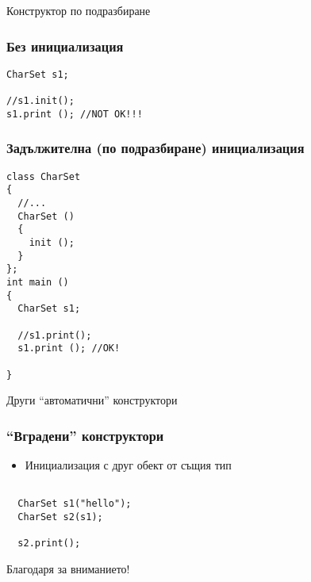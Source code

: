 \documentclass{beamer}
\begin{document}
\begin{frame}
\centerline{Конструктор по подразбиране}
\end{frame}


\begin{frame}[fragile]
\frametitle{Без инициализация}


\begin{flushleft}
\begin{lstlisting}
CharSet s1;

//s1.init();
s1.print (); //NOT OK!!!

\end{lstlisting}  
\end{flushleft}
\end{frame}

\begin{frame}[fragile]
\frametitle{Задължителна (по подразбиране) инициализация}


\begin{flushleft}
\begin{lstlisting}
class CharSet
{
  //...
  CharSet ()
  {
    init ();
  }
};
int main ()
{
  CharSet s1;

  //s1.print();
  s1.print (); //OK!

}
\end{lstlisting}  
\end{flushleft}
\end{frame}


\begin{frame}
\centerline{Други ``автоматични'' конструктори}
\end{frame}


\begin{frame}[fragile]
\frametitle{``Вградени'' конструктори}

\begin{itemize}
  \item Инициализация с друг обект от същия тип 
\end{itemize}

\begin{flushleft}
\begin{lstlisting}

  CharSet s1("hello");
  CharSet s2(s1); 

  s2.print();

\end{lstlisting}  
\end{flushleft}

\end{frame}

\begin{frame}
\centerline{Благодаря за вниманието!}
\end{frame}
\end{document}
